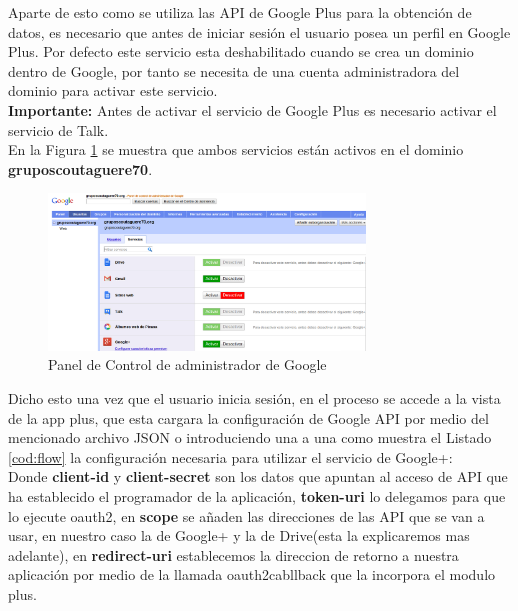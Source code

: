 Aparte de esto como se utiliza las API de Google Plus para la obtención de datos, es necesario que antes de iniciar sesión el usuario posea un perfil en Google Plus.
Por defecto este servicio esta deshabilitado cuando se crea un dominio dentro de Google, por tanto se necesita de una cuenta administradora del dominio para activar este servicio.\\

\textbf{Importante:} Antes de activar el servicio de Google Plus es necesario activar el servicio de Talk.\\

En la Figura \ref{fig:panel} se muestra  que ambos servicios están activos en el dominio \textbf{gruposcoutaguere70}.\\

\begin{figure}[H]
\begin{center}
\includegraphics[width=0.75\textwidth]{images/panel_google.jpg}
\caption{Panel de Control de administrador de Google}
\label{fig:panel}
\end{center}
\end{figure}


Dicho esto una vez que el usuario inicia sesión, en el proceso se accede a la vista de la app plus, que esta cargara la configuración de Google API por medio del mencionado archivo JSON o introduciendo una a una 
como muestra el Listado \ref{cod:flow} la configuración necesaria para utilizar el servicio de Google+:\\



Donde \textbf{client-id} y \textbf{client-secret} son los datos que apuntan al acceso de API que ha establecido el programador de la aplicación, \textbf{token-uri} lo delegamos para que lo ejecute oauth2, en \textbf{scope}
se añaden las direcciones de las API que se van a usar, en nuestro caso la de Google+ y la de Drive(esta la explicaremos mas adelante), en \textbf{redirect-uri} establecemos la direccion de retorno a nuestra aplicación 
por medio de la llamada oauth2cabllback que la incorpora el modulo plus.

